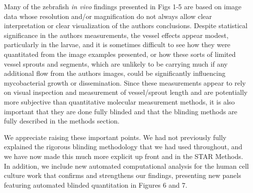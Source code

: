 \begin{description}[style=multiline, labelwidth=\widthof{Reviewer \#2:   }, font=\normalfont, leftmargin=\labelwidth, align=right]
\item[Reviewer \#2: ] \quad Many of the zebrafish \textit{in vivo} findings presented in Figs 1\hyp{}5 are based on image data whose resolution and/or magnification do not always allow clear interpretation or clear visualization of the authors conclusions. Despite statistical significance in the authors measurements, the vessel effects appear modest, particularly in the larvae, and it is sometimes difficult to see how they were quantitated from the image examples presented, or how these sorts of limited vessel sprouts and segments, which are unlikely to be carrying much if any additional flow from the authors images, could be significantly influencing mycobacterial growth or dissemination. Since these measurements appear to rely on visual inspection and measurement of vessel/sprout length and are potentially more subjective than quantitative molecular measurement methods, it is also important that they are done fully blinded and that the blinding methods are fully described in the methods section.

\item[Response: ] \quad We appreciate raising these important points. We had not previously fully explained the rigorous blinding methodology that we had used throughout, and we have now made this much more explicit up front and in the STAR Methods. In addition, we include new automated computational analysis for the human cell culture work that confirms and strengthens our findings, presenting new panels featuring automated blinded quantitation in Figures 6 and 7.


\end{description}
